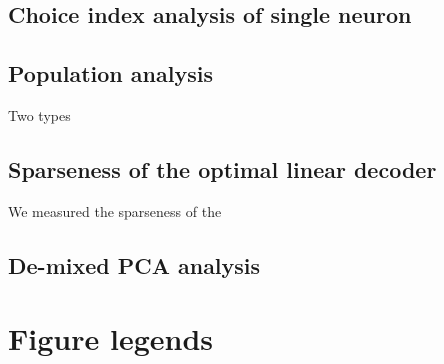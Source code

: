 \documentclass[12pt, oneside]{nature}
\begin{document}
\begin{methods}
\subsection{Choice index analysis of single neuron} 

\subsection{Population analysis}
Two types 

\subsection{Sparseness of the optimal linear decoder}
We measured the sparseness of the 

\subsection{De-mixed PCA analysis}

\end{methods}

%
%
%

\newpage

\section*{Figure legends}
\end{document}
